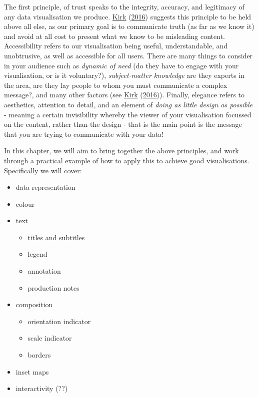 \documentclass[
]{book}
\providecommand{\tightlist}{%
  \setlength{\itemsep}{0pt}\setlength{\parskip}{0pt}}
\begin{document}
The first principle, of trust speaks to the integrity, accuracy, and legitimacy of any data visualisation we produce. \protect\hyperlink{ref-Kirk_2016}{Kirk} (\protect\hyperlink{ref-Kirk_2016}{2016}) suggests this principle to be held above all else, as our primary goal is to communicate truth (as far as we know it) and avoid at all cost to present what we know to be misleading content. Accessibility refers to our visualisation being useful, understandable, and unobtrusive, as well as accessible for all users. There are many things to consider in your audience such as \emph{dynamic of need} (do they have to engage with your visualisation, or is it voluntary?), \emph{subject-matter knowledge} are they experts in the area, are they lay people to whom you must communicate a complex message?, and many other factors (see \protect\hyperlink{ref-Kirk_2016}{Kirk} (\protect\hyperlink{ref-Kirk_2016}{2016})). Finally, elegance refers to aesthetics, attention to detail, and an element of \emph{doing as little design as possible} - meaning a certain invisibility whereby the viewer of your visualisation focussed on the content, rather than the design - that is the main point is the message that you are trying to communicate with your data!

In this chapter, we will aim to bring together the above principles, and work through a practical example of how to apply this to achieve good visualisations. Specifically we will cover:

\begin{itemize}
\tightlist
\item
  data representation
\item
  colour
\item
  text

  \begin{itemize}
  \tightlist
  \item
    titles and subtitles
  \item
    legend
  \item
    annotation
  \item
    production notes
  \end{itemize}
\item
  composition

  \begin{itemize}
  \tightlist
  \item
    orientation indicator
  \item
    scale indicator
  \item
    borders
  \end{itemize}
\item
  inset maps
\item
  interactivity (??)
\end{itemize}
\end{document}
